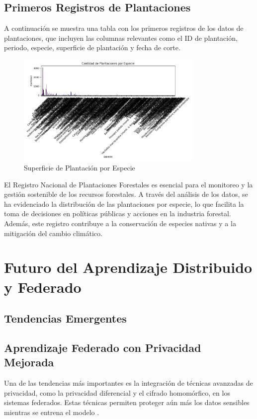 \subsection{Primeros Registros de Plantaciones}
A continuación se muestra una tabla con los primeros registros de los datos de plantaciones, que incluyen las columnas relevantes como el ID de plantación, periodo, especie, superficie de plantación y fecha de corte.

\begin{figure}[H]
	\centering
	\includegraphics[width=0.8\textwidth]{IMAGEN 1.png} %
	\caption{Superficie de Plantación por Especie}
	\label{fig:superficie_especie}
\end{figure}

El Registro Nacional de Plantaciones Forestales es esencial para el monitoreo y la gestión sostenible de los recursos forestales. A través del análisis de los datos, se ha evidenciado la distribución de las plantaciones por especie, lo que facilita la toma de decisiones en políticas públicas y acciones en la industria forestal. Además, este registro contribuye a la conservación de especies nativas y a la mitigación del cambio climático.
\section{Futuro del Aprendizaje Distribuido y Federado}
\label{chap:10}
\subsection{Tendencias Emergentes}
\subsection{Aprendizaje Federado con Privacidad Mejorada}
Una de las tendencias más importantes es la integración de técnicas avanzadas de privacidad, como la privacidad diferencial y el cifrado homomórfico, en los sistemas federados. Estas técnicas permiten proteger aún más los datos sensibles mientras se entrena el modelo \cite{abadi2016deep}.

